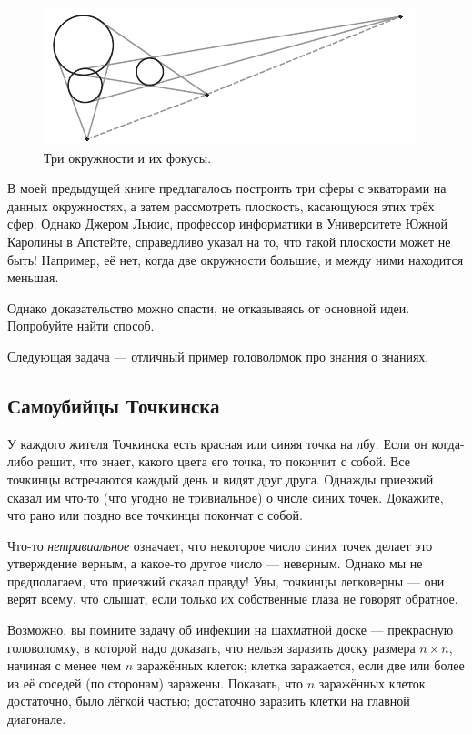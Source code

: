 \begin{figure}[h!]
\centering
\includegraphics[scale=1]{pics/3circs}
\caption{Три окружности и их фокусы.}
\label{pic:3circ}
\end{figure}

В моей предыдущей книге \cite{59} предлагалось построить три сферы с экваторами на данных окружностях, а затем рассмотреть плоскость, касающуюся этих трёх сфер.
Однако Джером Льюис, профессор информатики в Университете Южной Каролины в Апстейте, справедливо указал на то, что такой плоскости может не быть!
Например, её нет, когда две окружности большие, и между ними находится меньшая.

Однако доказательство можно спасти, не отказываясь от основной идеи.
Попробуйте найти способ.

\medskip

Следующая задача --- отличный пример головоломок про знания о знаниях.

\subsection*{Самоубийцы Точкинска}

У каждого жителя Точкинска есть красная или синяя точка на лбу.
Если он когда-либо решит, что знает, какого цвета его точка, то покончит с собой.
Все точкинцы встречаются каждый день и видят друг друга.
Однажды приезжий сказал им что-то (что угодно не тривиальное) о числе синих точек.
Докажите, что рано или поздно все точкинцы покончат с собой.

 Что-то \emph{нетривиальное} означает, что некоторое число синих точек делает это утверждение верным, а какое-то другое число --- неверным.
Однако мы не предполагаем, что приезжий сказал правду!
Увы, точкинцы легковерны --- они верят всему, что слышат, если только их собственные глаза не говорят обратное.

\medskip

Возможно, вы помните задачу об инфекции на шахматной доске --- прекрасную головоломку, в которой надо доказать, что нельзя заразить доску размера $n \times n$, начиная с менее чем $n$ заражённых клеток;
клетка заражается, если две или более из её соседей (по сторонам) заражены.
Показать, что $n$ заражённых клеток достаточно, было лёгкой частью; достаточно заразить клетки на главной диагонале.

